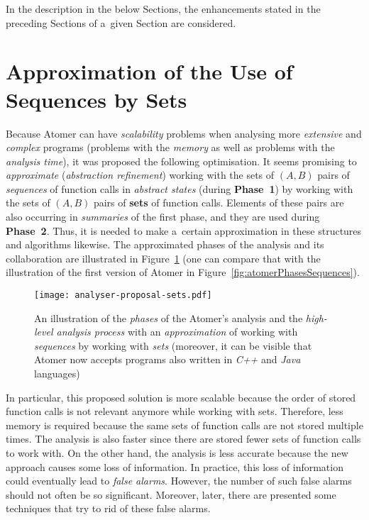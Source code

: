 In the description in the below Sections, the enhancements stated in the
preceding Sections of a~given Section are considered.



\section{Approximation of the Use of Sequences by Sets}
\label{sec:proposalSets}

Because Atomer can have \emph{scalability} problems when analysing
more \emph{extensive} and \emph{complex} programs (problems with the
\emph{memory} as well as problems with the \emph{analysis time}), it was
proposed the following optimisation. It seems promising to
\emph{approximate} (\emph{abstraction refinement}) working with the
sets of ${ (A, B) }$ pairs of \emph{sequences} of function calls in
\emph{abstract states} (during \textbf{Phase~1}) by working with the sets
of ${ (A, B) }$ pairs of \textbf{sets} of function calls. Elements of
these pairs are also occurring in \emph{summaries} of the first phase,
and they are used during \textbf{Phase~2}. Thus, it is needed to make
a~certain approximation in these structures and algorithms likewise.
The approximated phases of the analysis and its collaboration are
illustrated in Figure~\ref{fig:atomerPhasesSets} (one can compare that
with the illustration of the first version of Atomer in
Figure~\ref{fig:atomerPhasesSequences}).

\begin{figure}[hbt]
    \centering
    \texttt{[image: analyser-proposal-sets.pdf]}
    \caption{%
        An illustration of the \emph{phases} of the Atomer's analysis
        and the \emph{high-level analysis process} with an
        \emph{approximation} of working with \emph{sequences} by
        working with \emph{sets} (moreover, it can be visible that
        Atomer now accepts programs also written in \emph{C++} and
        \emph{Java} languages)%
    }
    \label{fig:atomerPhasesSets}
\end{figure}

In particular, this proposed solution is more scalable because the order
of stored function calls is not relevant anymore while working with
sets. Therefore, less memory is required because the same sets of
function calls are not stored multiple times. The analysis is also faster
since there are stored fewer sets of function calls to work with. On the
other hand, the analysis is less accurate because the new approach
causes some loss of information. In practice, this loss of information
could eventually lead to \emph{false alarms}. However, the number of
such false alarms should not often be so significant. Moreover, later,
there are presented some techniques that try to rid of these false
alarms.

